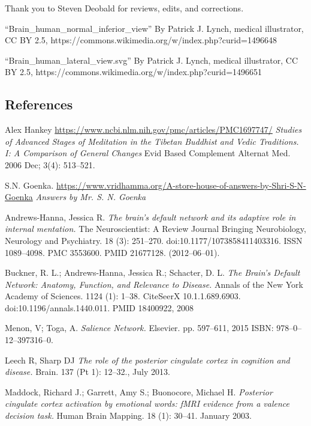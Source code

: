 \documentclass[a4paper, amsfonts, amssymb, amsmath, reprint, showkeys, nofootinbib, twoside]{revtex4-1}
\begin{document}
Thank you to Steven Deobald for reviews, edits, and corrections.

``Brain\_human\_normal\_inferior\_view'' By Patrick J. Lynch, medical illustrator, CC BY
2.5, https://commons.wikimedia.org/w/index.php?curid=1496648

``Brain\_human\_lateral\_view.svg'' By Patrick J. Lynch, medical illustrator, CC BY
2.5, https://commons.wikimedia.org/w/index.php?curid=1496651

\begin{thebibliography}{99}

\section*{References}

  Alex Hankey
  \url{https://www.ncbi.nlm.nih.gov/pmc/articles/PMC1697747/}
  \textit{Studies of Advanced Stages of Meditation in the Tibetan
          Buddhist and Vedic Traditions. I: A Comparison of General Changes}
  Evid Based Complement Alternat Med. 2006 Dec; 3(4): 513–521.

  S.N. Goenka.
  \url{https://www.vridhamma.org/A-store-house-of-answers-by-Shri-S-N-Goenka}
  \textit{Answers by Mr. S. N. Goenka}

  Andrews-Hanna, Jessica R.
  \textit{The brain’s default network and its adaptive role in internal mentation.}
  The Neuroscientist: A Review Journal Bringing Neurobiology, Neurology and
  Psychiatry. 18 (3): 251–270. doi:10.1177/1073858411403316. ISSN 1089–4098. PMC
  3553600. PMID 21677128. (2012–06–01).

  Buckner, R. L.; Andrews-Hanna, Jessica R.; Schacter, D. L.
  \textit{The Brain's Default Network: Anatomy, Function, and Relevance to Disease.}
  Annals of the New York Academy of Sciences. 1124 (1): 1–38. CiteSeerX
  10.1.1.689.6903. doi:10.1196/annals.1440.011. PMID 18400922, 2008

  Menon, V; Toga, A.
  \textit{Salience Network.}
  Elsevier. pp. 597–611, 2015
  ISBN: 978–0–12–397316–0.

  Leech R, Sharp DJ
  \textit{The role of the posterior cingulate cortex in cognition and disease.}
  Brain. 137 (Pt 1): 12–32., July 2013.

  Maddock, Richard J.; Garrett, Amy S.; Buonocore, Michael H.
  \textit{Posterior cingulate cortex activation by emotional words: fMRI evidence from a
    valence decision task.}
  Human Brain Mapping. 18 (1): 30–41. January 2003.


\end{thebibliography}
\end{document}
